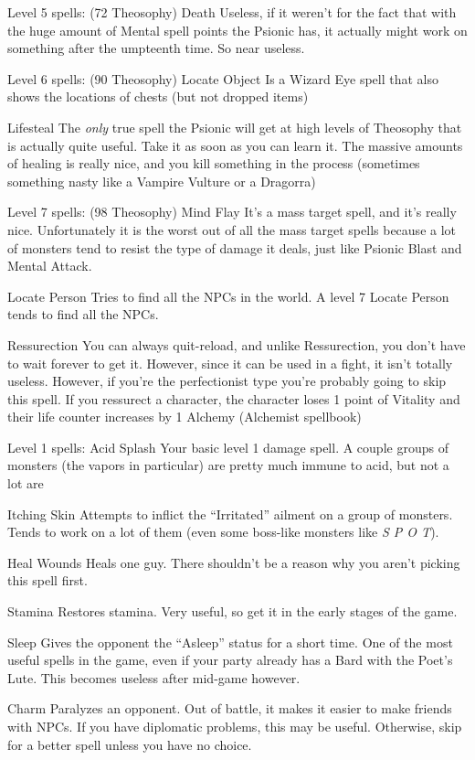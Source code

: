 \documentclass[12pt]{article}
\begin{document}
Level 5 spells: (72 Theosophy) Death Useless, if it weren't for the fact
that with the huge amount of Mental spell points the Psionic has, it
actually might work on something after the umpteenth time. So near
useless.

Level 6 spells: (90 Theosophy) Locate Object Is a Wizard Eye spell that
also shows the locations of chests (but not dropped items)

Lifesteal The \emph{only} true spell the Psionic will get at high levels
of Theosophy that is actually quite useful. Take it as soon as you can
learn it. The massive amounts of healing is really nice, and you kill
something in the process (sometimes something nasty like a Vampire
Vulture or a Dragorra)

Level 7 spells: (98 Theosophy) Mind Flay It's a mass target spell, and
it's really nice. Unfortunately it is the worst out of all the mass
target spells because a lot of monsters tend to resist the type of
damage it deals, just like Psionic Blast and Mental Attack.

Locate Person Tries to find all the NPCs in the world. A level 7 Locate
Person tends to find all the NPCs.

Ressurection You can always quit-reload, and unlike Ressurection, you
don't have to wait forever to get it. However, since it can be used in a
fight, it isn't totally useless. However, if you're the perfectionist
type you're probably going to skip this spell. If you ressurect a
character, the character loses 1 point of Vitality and their life
counter increases by 1 Alchemy (Alchemist spellbook)

Level 1 spells: Acid Splash Your basic level 1 damage spell. A couple
groups of monsters (the vapors in particular) are pretty much immune to
acid, but not a lot are

Itching Skin Attempts to inflict the ``Irritated'' ailment on a group of
monsters. Tends to work on a lot of them (even some boss-like monsters
like \emph{S P O T}).

Heal Wounds Heals one guy. There shouldn't be a reason why you aren't
picking this spell first.

Stamina Restores stamina. Very useful, so get it in the early stages of
the game.

Sleep Gives the opponent the ``Asleep'' status for a short time. One of
the most useful spells in the game, even if your party already has a
Bard with the Poet's Lute. This becomes useless after mid-game however.

Charm Paralyzes an opponent. Out of battle, it makes it easier to make
friends with NPCs. If you have diplomatic problems, this may be useful.
Otherwise, skip for a better spell unless you have no choice.
\end{document}
